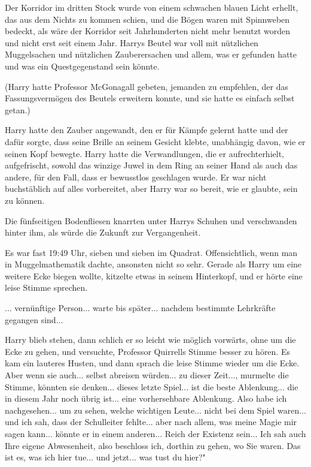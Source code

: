 Der Korridor im dritten Stock wurde von einem schwachen blauen Licht erhellt,
das aus dem Nichts zu kommen schien, und die Bögen waren mit Spinnweben bedeckt,
als wäre der Korridor seit Jahrhunderten nicht mehr benutzt worden und nicht
erst seit einem Jahr. Harrys Beutel war voll mit nützlichen Muggelsachen und
nützlichen Zauberersachen und allem, was er gefunden hatte und was ein
Questgegenstand sein könnte.

(Harry hatte Professor McGonagall gebeten, jemanden zu empfehlen, der das
Fassungsvermögen des Beutels erweitern konnte, und sie hatte es einfach selbst
getan.)

Harry hatte den Zauber angewandt, den er für Kämpfe gelernt hatte und der dafür
sorgte, dass seine Brille an seinem Gesicht klebte, unabhängig davon, wie er
seinen Kopf bewegte. Harry hatte die Verwandlungen, die er aufrechterhielt,
aufgefrischt, sowohl das winzige Juwel in dem Ring an seiner Hand als auch das
andere, für den Fall, dass er bewusstlos geschlagen wurde. Er war nicht
buchstäblich auf alles vorbereitet, aber Harry war so bereit, wie er glaubte,
sein zu können.

Die fünfseitigen Bodenfliesen knarrten unter Harrys Schuhen und verschwanden
hinter ihm, als würde die Zukunft zur Vergangenheit.

Es war fast 19:49 Uhr, sieben und sieben im Quadrat. Offensichtlich, wenn man in
Muggelmathematik dachte, ansonsten nicht so sehr. Gerade als Harry um eine
weitere Ecke biegen wollte, kitzelte etwas in seinem Hinterkopf, und er hörte
eine leise Stimme sprechen.

\glqq ... vernünftige Person... warte bis später... nachdem bestimmte Lehrkräfte
gegangen sind...\grqq{}

Harry blieb stehen, dann schlich er so leicht wie möglich vorwärts, ohne um die
Ecke zu gehen, und versuchte, Professor Quirrells Stimme besser zu hören. Es kam
ein lauteres Husten, und dann sprach die leise Stimme wieder um die Ecke. \glqq
Aber wenn sie auch... selbst abreisen würden... zu dieser Zeit...\grqq{},
murmelte die Stimme, \glqq könnten sie denken... dieses letzte Spiel... ist die
beste Ablenkung... die in diesem Jahr noch übrig ist... eine vorhersehbare
Ablenkung. Also habe ich nachgesehen... um zu sehen, welche wichtigen Leute...
nicht bei dem Spiel waren... und ich sah, dass der Schulleiter fehlte... aber
nach allem, was meine Magie mir sagen kann... könnte er in einem anderen...
Reich der Existenz sein... Ich sah auch Ihre eigene Abwesenheit, also beschloss
ich, dorthin zu gehen, wo Sie waren. Das ist es, was ich hier tue... und
jetzt... was tust du hier?"

